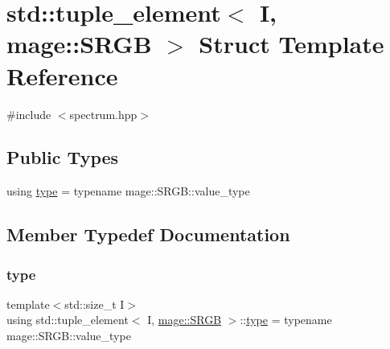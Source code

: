 \hypertarget{structstd_1_1tuple__element_3_01_i_00_01mage_1_1_s_r_g_b_01_4}{}\section{std\+:\+:tuple\+\_\+element$<$ I, mage\+:\+:S\+R\+GB $>$ Struct Template Reference}
\label{structstd_1_1tuple__element_3_01_i_00_01mage_1_1_s_r_g_b_01_4}


{\ttfamily \#include $<$spectrum.\+hpp$>$}

\subsection*{Public Types}
\begin{DoxyCompactItemize}
\item 
using \mbox{\hyperlink{structstd_1_1tuple__element_3_01_i_00_01mage_1_1_s_r_g_b_01_4_a372fdcfe6d022dd17a029e5bbe388748}{type}} = typename mage\+::\+S\+R\+G\+B\+::value\+\_\+type
\end{DoxyCompactItemize}


\subsection{Member Typedef Documentation}
\mbox{\label{structstd_1_1tuple__element_3_01_i_00_01mage_1_1_s_r_g_b_01_4_a372fdcfe6d022dd17a029e5bbe388748}} 
\subsubsection{\texorpdfstring{type}{type}}
{\footnotesize\ttfamily template$<$std\+::size\+\_\+t I$>$ \\
using std\+::tuple\+\_\+element$<$ I, \mbox{\hyperlink{structmage_1_1_s_r_g_b}{mage\+::\+S\+R\+GB}} $>$\+::\mbox{\hyperlink{structstd_1_1tuple__element_3_01_i_00_01mage_1_1_s_r_g_b_01_4_a372fdcfe6d022dd17a029e5bbe388748}{type}} =  typename mage\+::\+S\+R\+G\+B\+::value\+\_\+type}

